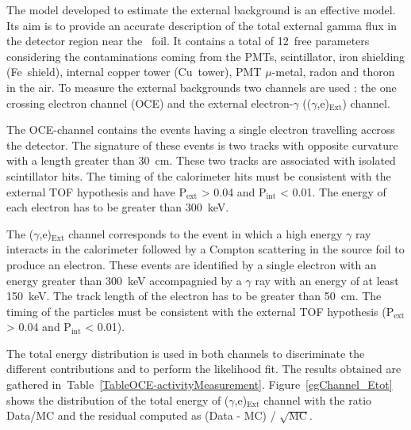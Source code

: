 \documentclass[main.tex]{subfiles}
\begin{document}
\bigskip


\NI The model developed to estimate the external background is an effective model. Its aim is to provide an accurate description of the total external gamma flux in the detector region near the \Cd~foil. It contains a total of 12~free parameters considering the contaminations coming from the PMTs, scintillator, iron shielding (Fe~shield), internal copper tower (Cu~tower), PMT $\mu$-metal, radon and thoron in the air. To measure the external backgrounds two channels are used : the one crossing electron channel (OCE) and the external electron-$\gamma$ (($\gamma$,e)$_{\text{Ext}}$) channel.


\bigskip


\NI The OCE-channel contains the events having a single electron travelling accross the detector. The signature of these events is two tracks with opposite curvature with a length greater than 30~cm. These two tracks are associated with isolated scintillator hits. The timing of the calorimeter hits must be consistent with the external TOF hypothesis and have P$_{\text{ext}}$ > 0.04 and P$_{\text{int}}$ < 0.01. The energy of each electron has to be greater than 300~keV.


\bigskip


\NI The ($\gamma$,e)$_{\text{Ext}}$ channel corresponds to the event in which a high energy $\gamma$ ray interacts in the calorimeter followed by a Compton scattering in the source foil to produce an electron. These events are identified by a single electron with an energy greater than 300~keV accompagnied by a $\gamma$ ray with an energy of at least 150~keV. The track length of the electron has to be greater than 50~cm. The timing of the particles must be consistent with the external TOF hypothesis (P$_{\text{ext}}$ > 0.04 and P$_{\text{int}}$ < 0.01).


\bigskip


\NI The total energy distribution is used in both channels to discriminate the different contributions and to perform the likelihood fit. The results obtained are gathered in~Table~\ref{TableOCE-activityMeasurement}. Figure~\ref{egChannel_Etot} shows the distribution of the total energy of ($\gamma$,e)$_{\text{Ext}}$ channel with the ratio Data/MC and the residual computed as (Data - MC) / $\sqrt{\text{MC}}$. 
\end{document}
